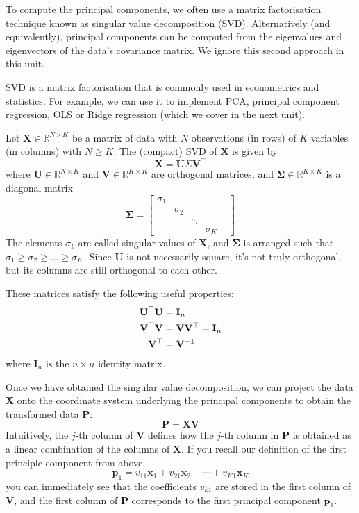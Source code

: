 \documentclass{scrartcl}
\begin{document}
To compute the principal components, we often use a matrix factorisation
technique known as
\href{https://en.wikipedia.org/wiki/Singular_value_decomposition}{singular
value decomposition} (SVD). Alternatively (and equivalently), principal
components can be computed from the eigenvalues and eigenvectors of the
data's covariance matrix. We ignore this second approach in this unit.

SVD is a matrix factorisation that is commonly used in econometrics and
statistics. For example, we can use it to implement PCA, principal
component regression, OLS or Ridge regression (which we cover in the
next unit).

Let \(\mathbf{X} \in \mathbb{R}^{N\times K}\) be a matrix of data with
\(N\) observations (in rows) of \(K\) variables (in columns) with
\(N \geq K\). The (compact) SVD of \(\mathbf{X}\) is given by \[
\mathbf{X} = \mathbf{U} \Sigma \mathbf{V}^\top
\] where \(\mathbf{U} \in \mathbb{R}^{N\times K}\) and
\(\mathbf{V} \in \mathbb{R}^{K\times K}\) are orthogonal matrices, and
\(\bm\Sigma \in \mathbb{R}^{K \times K}\) is a diagonal matrix \[
\bm\Sigma =  \begin{bmatrix} 
    \sigma_1 & & & & \\
     & \sigma_2 & & & \\
     & & \ddots & & \\
     & & & \sigma_K & 
\end{bmatrix}
\] The elements \(\sigma_k\) are called singular values of
\(\mathbf{X}\), and \(\bm\Sigma\) is arranged such that
\(\sigma_1 \geq \sigma_2 \geq \dots \geq \sigma_K\). Since
\(\mathbf{U}\) is not necessarily square, it's not truly orthogonal, but
its columns are still orthogonal to each other.

These matrices satisfy the following useful properties: \[
\def\bV{\mathbf{V}}
\def\bU{\mathbf{U}}
\def\bI{\mathbf{I}}
\begin{aligned}
    \bU^\top \bU &= \bI_n \\
    \bV^\top \bV &= \bV\bV^\top = \bI_n \\
    \bV^\top &= \bV^{-1}
\end{aligned}
\] where \(\mathbf{I}_n\) is the \(n\times n\) identity matrix.

Once we have obtained the singular value decomposition, we can project
the data \(\mathbf{X}\) onto the coordinate system underlying the
principal components to obtain the transformed data \(\mathbf{P}\): \[
    \mathbf{P} = \mathbf{X} \mathbf{V}
\] Intuitively, the \(j\)-th column of \(\mathbf{V}\) defines how the
\(j\)-th column in \(\mathbf{P}\) is obtained as a linear combination of
the columns of \(\mathbf{X}\). If you recall our definition of the first
principle component from above, \[
\mathbf{p}_1 = v_{11} \mathbf{x}_1 + v_{21} \mathbf{x}_2 + \cdots + v_{K1} \mathbf{x}_K
\] you can immediately see that the coefficients \(v_{k1}\) are stored
in the first column of \(\mathbf{V}\), and the first column of
\(\mathbf{P}\) corresponds to the first principal component
\(\mathbf{p}_1\).
\end{document}
